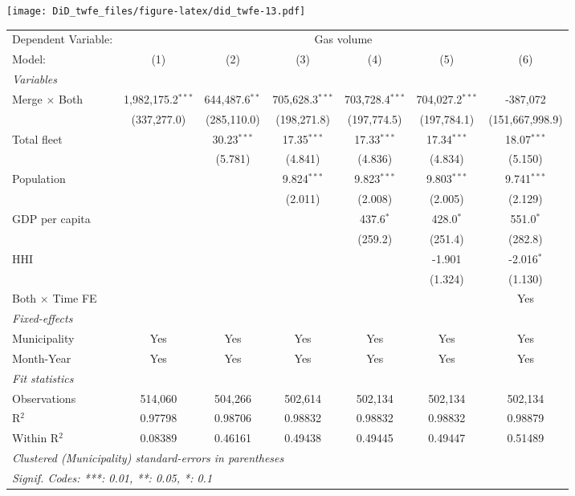 \documentclass[
]{article}
\begin{document}
\texttt{[image: DiD\_twfe\_files/figure-latex/did\_twfe-13.pdf]}

\begin{tabular}{lcccccc}
\tabularnewline\midrule\midrule
Dependent Variable:&\multicolumn{6}{c}{Gas volume}\\
Model:&(1) & (2) & (3) & (4) & (5) & (6)\\
\midrule \emph{Variables}&   &   &   &   &   &  \\
Merge $\times $ Both & 1,982,175.2$^{***}$ & 644,487.6$^{**}$ & 705,628.3$^{***}$ & 703,728.4$^{***}$ & 704,027.2$^{***}$ & -387,072\\
  &(337,277.0) & (285,110.0) & (198,271.8) & (197,774.5) & (197,784.1) & (151,667,998.9)\\
Total fleet &    & 30.23$^{***}$ & 17.35$^{***}$ & 17.33$^{***}$ & 17.34$^{***}$ & 18.07$^{***}$\\
  &   & (5.781) & (4.841) & (4.836) & (4.834) & (5.150)\\
Population &    &    & 9.824$^{***}$ & 9.823$^{***}$ & 9.803$^{***}$ & 9.741$^{***}$\\
  &   &    & (2.011) & (2.008) & (2.005) & (2.129)\\
GDP per capita &    &    &    & 437.6$^{*}$ & 428.0$^{*}$ & 551.0$^{*}$\\
  &   &    &    & (259.2) & (251.4) & (282.8)\\
HHI &    &    &    &    & -1.901 & -2.016$^{*}$\\
  &   &    &    &    & (1.324) & (1.130)\\
Both $\times$ Time FE &  &  &  &  &  & Yes\\
\midrule \emph{Fixed-effects}&   &   &   &   &   &  \\
Municipality & Yes & Yes & Yes & Yes & Yes & Yes\\
Month-Year & Yes & Yes & Yes & Yes & Yes & Yes\\
\midrule \emph{Fit statistics}&  & & & & & \\
Observations & 514,060&504,266&502,614&502,134&502,134&502,134\\
R$^2$ & 0.97798&0.98706&0.98832&0.98832&0.98832&0.98879\\
Within R$^2$ & 0.08389&0.46161&0.49438&0.49445&0.49447&0.51489\\
\midrule\midrule\multicolumn{7}{l}{\emph{Clustered (Municipality) standard-errors in parentheses}}\\
\multicolumn{7}{l}{\emph{Signif. Codes: ***: 0.01, **: 0.05, *: 0.1}}\\
\end{tabular}
\end{document}
